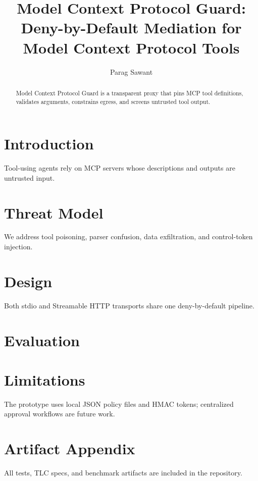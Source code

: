 \documentclass{article}
\title{Model Context Protocol Guard: Deny-by-Default Mediation for Model Context Protocol Tools}
\author{Parag Sawant}
\begin{document}
\maketitle
\begin{abstract}
Model Context Protocol Guard is a transparent proxy that pins MCP tool definitions, validates arguments, constrains egress, and screens untrusted tool output.
\end{abstract}
\section{Introduction}
Tool-using agents rely on MCP servers whose descriptions and outputs are untrusted input.
\section{Threat Model}
We address tool poisoning, parser confusion, data exfiltration, and control-token injection.
\section{Design}
Both stdio and Streamable HTTP transports share one deny-by-default pipeline.
\section{Evaluation}

\section{Limitations}
The prototype uses local JSON policy files and HMAC tokens; centralized approval workflows are future work.
\section{Artifact Appendix}
All tests, TLC specs, and benchmark artifacts are included in the repository.
\end{document}
